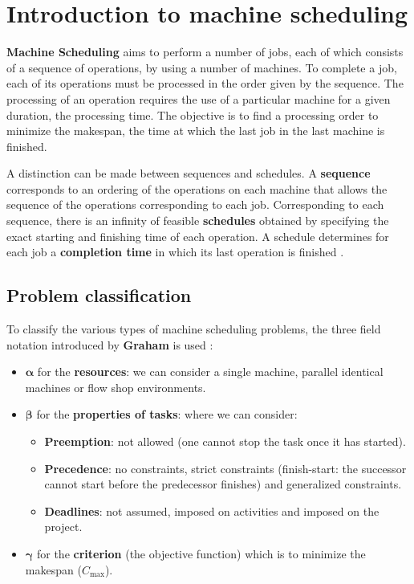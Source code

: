 \chapter{Introduction to machine scheduling}
\label{sec:intro_proj_sch}

\textbf{Machine Scheduling} aims to perform a number of jobs, each of which consists of a sequence of operations, by using a number of machines. To complete a job, each of its operations must be processed in the order given by the sequence. The processing of an operation requires the use of a particular machine for a given duration, the processing time. The objective is to find a processing order to minimize the makespan, the time at which the last job in the last machine is finished.

A distinction can be made between sequences and schedules. A \textbf{sequence} corresponds to an ordering of the operations on each machine that allows the sequence of the operations corresponding to each job. Corresponding to each sequence, there is an infinity of feasible \textbf{schedules} obtained by specifying the exact starting and finishing time of each operation. A schedule determines for each job a \textbf{completion time} in which its last operation is finished \cite{kan2012machine}.

\section[Problem classification]{Problem classification}

To classify the various types of machine scheduling problems, the three field notation introduced by \textbf{Graham} is used \cite{10.1145/3431232} \cite{weglarz2012project}:
\begin{itemize}
    \item $\boldsymbol{\alpha}$ for the \textbf{resources}: we can consider a single machine, parallel identical machines or flow shop environments.
    \item $\boldsymbol{\beta}$ for the \textbf{properties of tasks}: where we can consider:
    \begin{itemize}
        \item \textbf{Preemption}: not allowed (one cannot stop the task once it has started).
        \item \textbf{Precedence}: no constraints, strict constraints (finish-start: the successor cannot start before the predecessor finishes) and generalized constraints.
        \item \textbf{Deadlines}: not assumed, imposed on activities and imposed on the project.
    \end{itemize}
    \item $\boldsymbol{\gamma}$ for the \textbf{criterion} (the objective function) which is to minimize the makespan ($C_{\text{max}}$).
\end{itemize}

